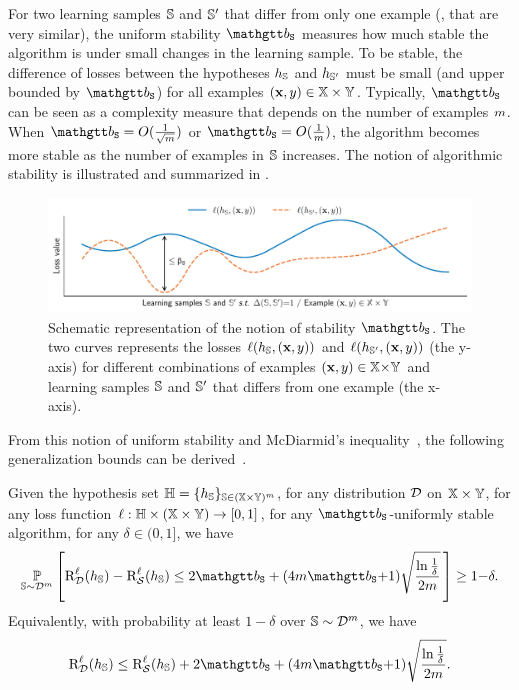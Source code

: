 For two learning samples $\S$ and $\S'$ that differ from only one example (\ie, that are very similar), the uniform stability $\stab$ measures how much stable the algorithm is under small changes in the learning sample.
To be stable, the difference of losses between the hypotheses $\h_{\S}$ and $\h_{\S'}$ must be small (and upper bounded by $\stab$) for all examples $(\x,\y)\in\X\times\Y$.
Typically, $\stab$ can be seen as a complexity measure that depends on the number of examples $\m$. 
When $\stab=O(\frac{1}{\sqrt{\m}})$ or $\stab=O(\frac{1}{\m})$, the algorithm becomes more stable as the number of examples in $\S$ increases.
The notion of algorithmic stability is illustrated and summarized in .
\begin{figure}
    \centering
    \includegraphics[width=\textwidth]{chapter_1/figures/stability.pdf}
    \caption[Schematic Representation of the Uniform Stability]{
    Schematic representation of the notion of stability $\stab$.
    The two curves represents the losses $\loss(\h_\S, (\x,\y))$ and $\loss(\h_{\S'}, (\x,\y))$ (the y-axis) for different combinations of examples $(\x, \y)\in \X{\times}\Y$ and learning samples $\S$ and $\S'$ that differs from one example (the x-axis).
    }
    \label{chap:intro:fig:stability}
\end{figure}
From this notion of uniform stability and McDiarmid's inequality~\citep{McDiarmid1989}, the following generalization bounds can be derived~\citep{BousquetElisseeff2002}.

\begin{theorem} Given the hypothesis set $\H = \{\h_{\S}\}_{\S\in(\X{\times}\Y)^\m}$, for any distribution $\D$ on $\X\times\Y$, for any loss function $\loss: \H\times(\X\times\Y) \to [0,1]$, for any $\stab$-uniformly stable algorithm, for any $\delta\in(0,1]$, we have 
\begin{align*}
    \PP_{\S\sim\D^\m}\LB\RiskLoss_{\D}(\h_{\S})-\RiskLoss_{\dS}(\h_{\S}) \le 2\stab + (4\m\stab{+}1)\sqrt{\frac{\ln\frac{1}{\delta}}{2\m}}\,\RB\ge 1{-}\delta.
\end{align*}
Equivalently, with probability at least $1{-}\delta$ over $\S\sim\D^\m$, we have
\begin{align*}
    \RiskLoss_{\D}(\h_{\S}) \le \RiskLoss_{\dS}(\h_{\S}) + 2\stab + (4\m\stab{+}1)\sqrt{\frac{\ln\frac{1}{\delta}}{2\m}}.
\end{align*}
\end{theorem}

